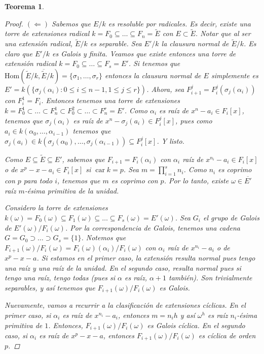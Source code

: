 \documentclass[12pt]{book}
\newtheorem{teo}{Teorema}[section]
\theoremstyle{definition}
\renewcommand{\hom}{\mathrm{Hom}}
\DeclareMathOperator{\car}{car}
\begin{document}
\begin{teo}
\begin{proof}
$(\Longleftarrow)$ Sabemos que $E/k$ es resoluble por radicales. Es decir, existe una torre de extensiones radical $k=F_0\subseteq \ldots\subseteq F_n=\widetilde{E}$ con $E\subset\widetilde{E}$. Notar que al ser una extensión radical, $\widetilde{E}/k$ es separable. Sea $E'/k$ la clausura normal de $\widetilde{E}/k$. Es claro que $E'/k$ es Galois y finita. Veamos que existe entonces una torre de extensión radical $k=F_0\subseteq\ldots\subseteq F_s=E'$. Si tenemos que $\hom(\widetilde{E}/k,\overline{\widetilde{E}}/k) = \{\sigma_1,\ldots , \sigma_r\}$ entonces la clausura normal de $E$ simplemente es $E' = k(\{\sigma_j(\alpha_i) : 0\leq i\leq n-1, 1\leq j\leq r\})$.	Ahora, sea $F_{i+1}^j = F_i^j(\sigma_j(\alpha_i))$ con $F_i^1 = F_i$. Entonces tenemos una torre de extensiones $k=F_0^1 \subset \ldots \subset F_n^1 \subset F_0^2 \subset\ldots \subset F_n^r = E'$. Como $\alpha_i$ es raíz de $x^n - a_i\in F_i[x]$, tenemos que $\sigma_j(\alpha_i)$ es raíz de $x^n - \sigma_j(a_i)\in F_i^j[x]$, pues como $a_i\in k(\alpha_0,\ldots ,\alpha_{i-1})$ tenemos que $\sigma_j(a_i)\in k(\sigma_j(\alpha_0),\ldots , \sigma_j(\alpha_{i-1}))\subseteq F_i^j[x]$. Y listo.

Como $E\subseteq\widetilde{E}\subseteq E'$, sabemos que $F_{i+1}=F_i(\alpha_i)$ con $\alpha_i$ raíz de $x^{n_i}-a_i\in F_i[x]$ o de $x^p - x - a_i\in F_i[x]$ si $\car k=p$. Sea $m=\displaystyle\prod_{i=1}^s n_i$. Como $n_i$ es coprimo con $p$ para todo $i$, tenemos que $m$ es coprimo con $p$. Por lo tanto, existe $\omega\in \overline{E'}$ raíz $m$-ésima primitiva de la unidad.

Considero la torre de extensiones $k(\omega)=F_0(\omega)\subseteq F_1(\omega)\subseteq\ldots\subseteq F_s(\omega)=E'(\omega)$. Sea $G_i$ el grupo de Galois de $E'(\omega)/F_i(\omega)$. Por la correspondencia de Galois, tenemos una cadena $G=G_0\supset\ldots \supset G_s=\{1\}$. Notemos que $F_{i+1}(\omega)/F_i(\omega)=F_i(\omega)(\alpha_{i})/F_i(\omega)$ con $\alpha_i$ raíz de $x^{n_i}-a_i$ o de $x^p - x - a$. Si estamos en el primer caso, la extensión resulta normal pues tengo una raíz y una raíz de la unidad. En el segundo caso, resulta normal pues si tengo una raíz, tengo todas (pues si $\alpha$ es raíz, $\alpha+1$ también). Son trivialmente separables, y así tenemos que $F_{i+1}(\omega)/F_i(\omega)$ es Galois.

Nuevamente, vamos a recurrir a la clasificación de extensiones cíclicas. En el primer caso, si $\alpha_i$ es raíz de $x^{n_i}-a_i$, entonces $m=n_i h$ y así $\omega^h$ es raíz $n_i$-ésima primitiva de $1$. Entonces, $F_{i+1}(\omega)/F_i(\omega)$ es Galois cíclica. En el segundo caso, si $\alpha_i$ es raíz de $x^p - x - a$, entonces $F_{i+1}(\omega)/F_i(\omega)$ es cíclica de orden $p$.


\end{proof}
\end{teo}
\end{document}
